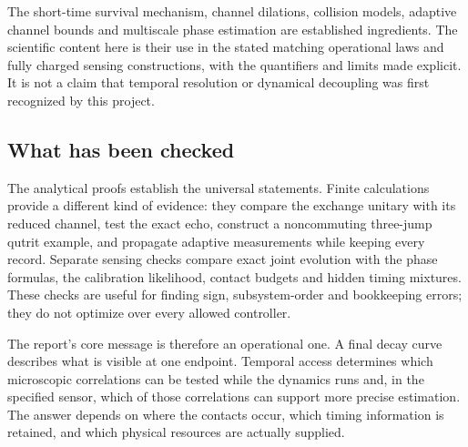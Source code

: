 \documentclass[11pt,a4paper]{article}
\numberwithin{equation}{section}
\theoremstyle{remark}
\begin{document}
The short-time survival mechanism, channel dilations, collision models,
adaptive channel bounds and multiscale phase estimation are established
ingredients. The scientific content here is their use in the stated
matching operational laws and fully charged sensing constructions, with
the quantifiers and limits made explicit. It is not a claim that temporal
resolution or dynamical decoupling was first recognized by this project.

\subsection{What has been checked}

The analytical proofs establish the universal statements. Finite calculations
provide a different kind of evidence: they compare the exchange unitary
with its reduced channel, test the exact echo, construct a noncommuting
three-jump qutrit example, and propagate adaptive measurements while keeping
every record. Separate sensing checks compare exact joint evolution with
the phase formulas, the calibration likelihood, contact budgets and hidden
timing mixtures. These checks are useful for finding sign, subsystem-order
and bookkeeping errors; they do not optimize over every allowed controller.

The report's core message is therefore an operational one. A final decay
curve describes what is visible at one endpoint. Temporal access determines
which microscopic correlations can be tested while the dynamics runs and,
in the specified sensor, which of those correlations can support more precise
estimation. The answer depends on where the contacts occur, which timing
information is retained, and which physical resources are actually supplied.
\end{document}
